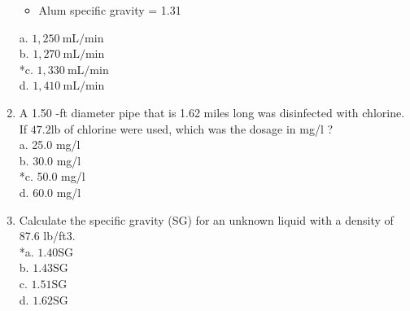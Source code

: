 \begin{enumerate}
\begin{itemize}
\item Alum specific gravity = 1.31\\
  \end{itemize}
a. $1,250 \mathrm{~mL} / \mathrm{min}$\\
b. $1,270 \mathrm{~mL} / \mathrm{min}$\\
*c. $1,330 \mathrm{~mL} / \mathrm{min}$\\
d. $1,410 \mathrm{~mL} / \mathrm{min}$ \\
\item A 1.50 -ft diameter pipe that is 1.62 miles long was disinfected with chlorine. If $47.2 \mathrm{lb}$ of chlorine were used, which was the dosage in mg/l ?\\
a. 25.0 mg/l\\
b. 30.0 mg/l\\
*c. 50.0 mg/l\\
d. 60.0 mg/l\\
\item Calculate the specific gravity (SG) for an unknown liquid with a density of 87.6 lb/ft3.\\
*a. $1.40 \mathrm{SG}$\\
b. $1.43 \mathrm{SG}$\\
c. $1.51 \mathrm{SG}$\\
d. $1.62 \mathrm{SG}$\\
\end{enumerate}
\newpage
